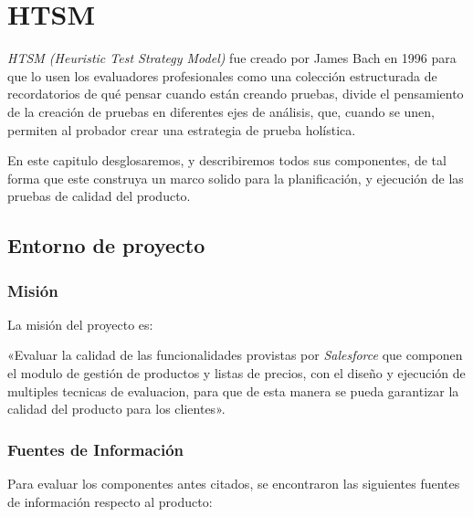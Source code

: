 \chapter{HTSM}

\emph{HTSM (Heuristic Test Strategy Model)} fue creado por James Bach en 1996
para que lo usen los evaluadores profesionales como una colección estructurada
de recordatorios de qué pensar cuando están creando pruebas, divide el
pensamiento de la creación de pruebas en diferentes ejes de análisis, que,
cuando se unen, permiten al probador crear una estrategia de prueba
holística\cite{Bach}.

En este capitulo desglosaremos, y describiremos todos sus componentes, de tal
forma que este construya un marco solido para la planificación, y ejecución de
las pruebas de calidad del producto.

\section{Entorno de proyecto}
\subsection{Misión}

La misión del proyecto es:

«Evaluar la calidad de las funcionalidades provistas por \emph{Salesforce} que
componen el modulo de gestión de productos y listas de precios, con el diseño y
ejecución de multiples tecnicas de evaluacion, para que de esta manera se pueda
garantizar la calidad del producto para los clientes».

\subsection{Fuentes de Información}

Para evaluar los componentes antes citados, se encontraron las siguientes
fuentes de información respecto al producto:

